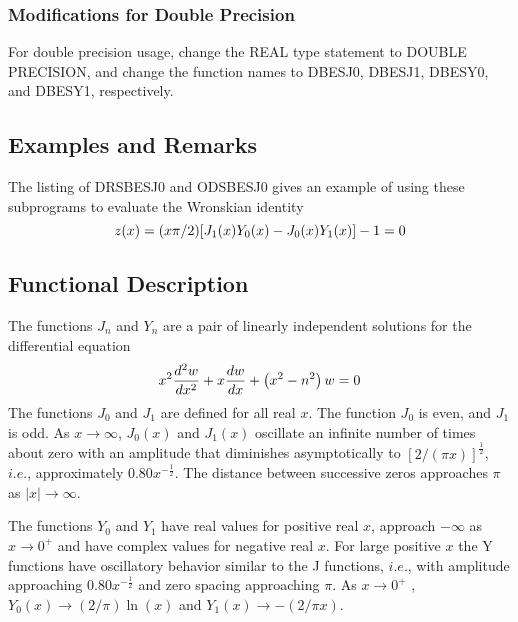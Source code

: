 \documentclass[twoside]{MATH77}
\begin{document}
\subsubsection{Modifications for Double Precision}
For double precision usage, change the REAL type statement to DOUBLE
PRECISION, and change the function names to DBESJ0, DBESJ1, DBESY0, and DBESY1,
respectively.

\subsection{Examples and Remarks}

The listing of DRSBESJ0 and ODSBESJ0 gives an example of using these
subprograms to evaluate the Wronskian identity
\begin{equation}
z(x) = (x\pi /2)[J_1(x)Y_0(x)-J_0(x)Y_1(x)] - 1 = 0\notag
\end{equation}

\subsection{Functional Description}

The functions $J_n$ and $Y_n$ are a pair of linearly
independent solutions for the differential equation
\begin{equation}
x^2\frac{d^2w}{dx^2}+x\frac{dw}{dx}+\left( x^2-n^2\right) w=0\notag
\end{equation}
The functions $J_0$ and $J_1$ are defined for all real $x$. The function $J_0
$ is even, and $J_1$ is odd. As $x\rightarrow \infty $, $J_0(x)$ and $J_1(x)$
oscillate an infinite number of times about zero with an amplitude that
diminishes asymptotically to $[2/(\pi x)]^{\frac 12}$, $i.e.$, approximately
$0.80x^{-\frac 12}$. The distance between successive zeros approaches $\pi $
as $|x|\rightarrow \infty .$

The functions $Y_0$ and $Y_1$ have real values for positive real $x$,
approach $-\infty $ as $x\rightarrow 0^{+}$ and have complex values for
negative real $x$. For large positive $x$ the Y functions have oscillatory
behavior similar to the J functions, $i.e.$, with amplitude approaching $0.80
x^{-\frac 12}$ and zero spacing approaching $\pi $. As $x\rightarrow 0^{+}$%
, $Y_0(x)\rightarrow (2/\pi )\ln (x)$ and $Y_1(x)\rightarrow -(2/\pi x).$

\vspace{10pt}

\hspace{5pt}\mbox{ }
\end{document}
